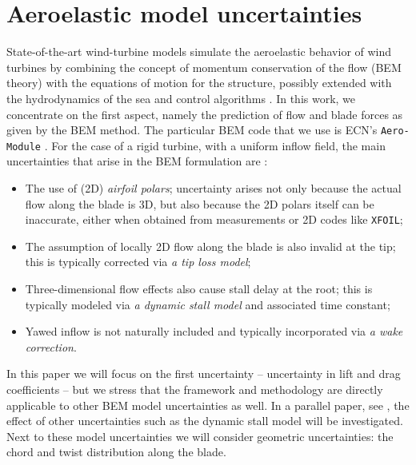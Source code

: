 \section{Aeroelastic model uncertainties}\label{sec:model_description}
State-of-the-art wind-turbine models simulate the aeroelastic behavior of wind turbines by combining the concept of momentum conservation of the flow (BEM theory) with the equations of motion for the structure, possibly extended with the hydrodynamics of the sea and control algorithms \cite{Vorpahl2013}. In this work, we concentrate on the first aspect, namely the prediction of flow and blade forces as given by the BEM method. The particular BEM code that we use is ECN's \texttt{Aero-Module} \cite{Boorsma2012}. For the case of a rigid turbine, with a uniform inflow field, the main uncertainties that arise in the BEM formulation are \cite{Hansen1993}:
\begin{itemize}
\item The use of (2D) \textit{airfoil polars}; uncertainty arises not only because the actual flow along the blade is 3D, but also because the 2D polars itself can be inaccurate, either when obtained from measurements or 2D codes like \texttt{XFOIL};
\item The assumption of locally 2D flow along the blade is also invalid at the tip; this is typically corrected via \textit{a tip loss model};
\item Three-dimensional flow effects also cause stall delay at the root; this is typically modeled via \textit{a dynamic stall model} and associated time constant;
\item Yawed inflow is not naturally included and typically incorporated via \textit{a wake correction}.
\end{itemize}
In this paper we will focus on the first uncertainty -- uncertainty in lift and drag coefficients -- but we stress that the framework and methodology are directly applicable to other BEM model uncertainties as well. In a parallel paper, see \cite{Caboni2020}, the effect of other uncertainties such as the dynamic stall model will be investigated. Next to these model uncertainties we will consider geometric uncertainties: the chord and twist distribution along the blade.

